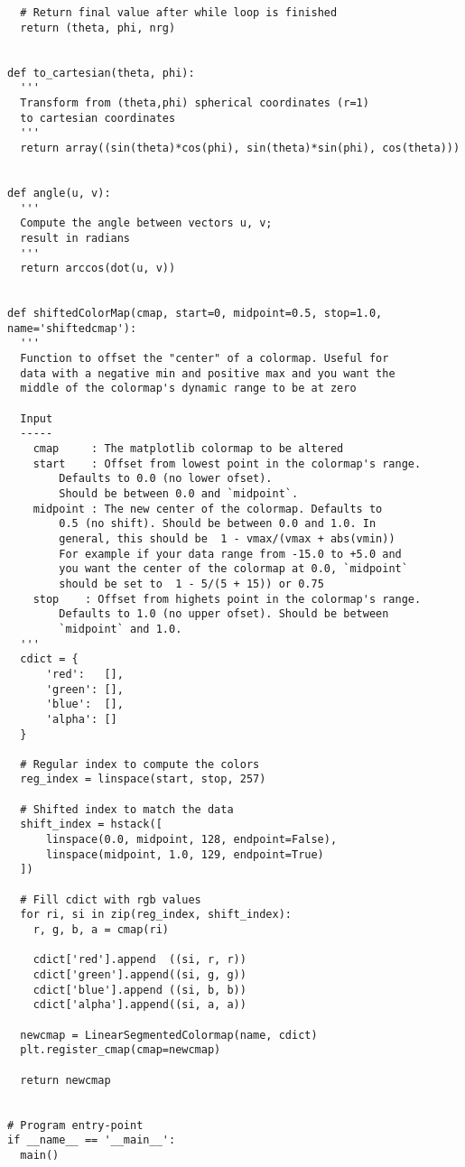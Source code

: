 \begin{lstlisting}
  # Return final value after while loop is finished
  return (theta, phi, nrg)


def to_cartesian(theta, phi):
  '''
  Transform from (theta,phi) spherical coordinates (r=1)
  to cartesian coordinates
  '''
  return array((sin(theta)*cos(phi), sin(theta)*sin(phi), cos(theta)))


def angle(u, v):
  '''
  Compute the angle between vectors u, v;
  result in radians
  '''
  return arccos(dot(u, v))


def shiftedColorMap(cmap, start=0, midpoint=0.5, stop=1.0, name='shiftedcmap'):
  '''
  Function to offset the "center" of a colormap. Useful for
  data with a negative min and positive max and you want the
  middle of the colormap's dynamic range to be at zero

  Input
  -----
    cmap     : The matplotlib colormap to be altered
    start    : Offset from lowest point in the colormap's range.
        Defaults to 0.0 (no lower ofset).
        Should be between 0.0 and `midpoint`.
    midpoint : The new center of the colormap. Defaults to 
        0.5 (no shift). Should be between 0.0 and 1.0. In
        general, this should be  1 - vmax/(vmax + abs(vmin))
        For example if your data range from -15.0 to +5.0 and
        you want the center of the colormap at 0.0, `midpoint`
        should be set to  1 - 5/(5 + 15)) or 0.75
    stop    : Offset from highets point in the colormap's range.
        Defaults to 1.0 (no upper ofset). Should be between
        `midpoint` and 1.0.
  '''
  cdict = {
      'red':   [],
      'green': [],
      'blue':  [],
      'alpha': []
  }

  # Regular index to compute the colors
  reg_index = linspace(start, stop, 257)

  # Shifted index to match the data
  shift_index = hstack([
      linspace(0.0, midpoint, 128, endpoint=False), 
      linspace(midpoint, 1.0, 129, endpoint=True)
  ])

  # Fill cdict with rgb values
  for ri, si in zip(reg_index, shift_index):
    r, g, b, a = cmap(ri)

    cdict['red'].append  ((si, r, r))
    cdict['green'].append((si, g, g))
    cdict['blue'].append ((si, b, b))
    cdict['alpha'].append((si, a, a))

  newcmap = LinearSegmentedColormap(name, cdict)
  plt.register_cmap(cmap=newcmap)

  return newcmap


# Program entry-point
if __name__ == '__main__':
  main()
\end{lstlisting}
